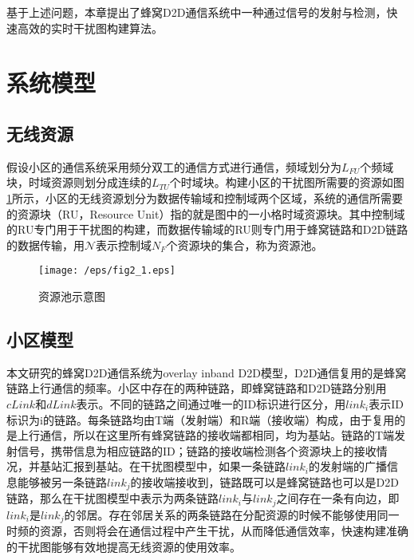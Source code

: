 \documentclass[figurelist,tablelist,algorithmlist,nomlist,masters]{seuthesix}
\begin{document}
	基于上述问题，本章提出了蜂窝D2D通信系统中一种通过信号的发射与检测，快速高效的实时干扰图构建算法。
	
	\section{系统模型}
	\subsection{无线资源}
	假设小区的通信系统采用频分双工的通信方式进行通信，频域划分为$L_{FU}$个频域块，时域资源则划分成连续的$L_{TU}$个时域块。构建小区的干扰图所需要的资源如图\ref{fig2_1}所示，小区的无线资源划分为数据传输域和控制域两个区域，系统的通信所需要的资源块（RU，Resource Unit）指的就是图中的一小格时域资源块。其中控制域的RU专门用于干扰图的构建，而数据传输域的RU则专门用于蜂窝链路和D2D链路的数据传输，用$\mathcal{N}$表示控制域$N_{F}$个资源块的集合，称为资源池。
	\begin{figure}[htb]
		\centering
		\texttt{[image: /eps/fig2\_1.eps]}
		\caption{资源池示意图}
		\label{fig2_1}
	\end{figure}

	
	\subsection{小区模型}
	本文研究的蜂窝D2D通信系统为overlay inband D2D模型，D2D通信复用的是蜂窝链路上行通信的频率。小区中存在的两种链路，即蜂窝链路和D2D链路分别用$cLink$和$dLink$表示。不同的链路之间通过唯一的ID标识进行区分，用$link_i$表示ID标识为i的链路。每条链路均由T端（发射端）和R端（接收端）构成，由于复用的是上行通信，所以在这里所有蜂窝链路的接收端都相同，均为基站。链路的T端发射信号，携带信息为相应链路的ID；链路的接收端检测各个资源块上的接收情况，并基站汇报到基站。在干扰图模型中，如果一条链路$link_i$的发射端的广播信息能够被另一条链路$link_j$的接收端接收到，链路既可以是蜂窝链路也可以是D2D链路，那么在干扰图模型中表示为两条链路$link_i$与$link_j$之间存在一条有向边，即$link_i$是$link_j$的邻居。存在邻居关系的两条链路在分配资源的时候不能够使用同一时频的资源，否则将会在通信过程中产生干扰，从而降低通信效率，快速构建准确的干扰图能够有效地提高无线资源的使用效率。
	
\end{document}
